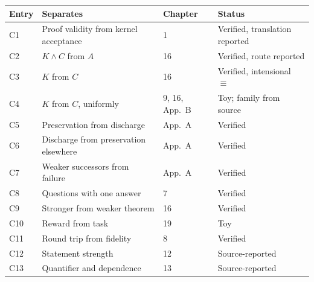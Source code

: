 \begin{center}
\small
\begin{tabular}{@{}llll@{}}
\toprule
Entry & Separates & Chapter & Status \\
\midrule
C1 & Proof validity from kernel acceptance & 1 & Verified, translation reported \\
C2 & $K\wedge C$ from $A$ & 16 & Verified, route reported \\
C3 & $K$ from $C$ & 16 & Verified, intensional $\equiv$ \\
C4 & $K$ from $C$, uniformly & 9, 16, App.~B & Toy; family from source \\
C5 & Preservation from discharge & App.~A & Verified \\
C6 & Discharge from preservation elsewhere & App.~A & Verified \\
C7 & Weaker successors from failure & App.~A & Verified \\
C8 & Questions with one answer & 7 & Verified \\
C9 & Stronger from weaker theorem & 16 & Verified \\
C10 & Reward from task & 19 & Toy \\
C11 & Round trip from fidelity & 8 & Verified \\
C12 & Statement strength & 12 & Source-reported \\
C13 & Quantifier and dependence & 13 & Source-reported \\
\bottomrule
\end{tabular}
\end{center}
